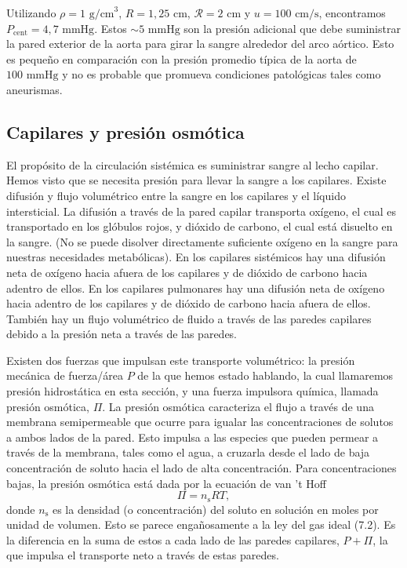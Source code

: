 \documentclass[12pt]{book}
\begin{document}
Utilizando $\rho = 1\text{ g/cm}^3$, $R = 1{,}25\text{ cm}$, $\mathcal{R} = 2\text{ cm}$ y $u = 100\text{ cm/s}$, encontramos $P_{\text{cent}} = 4{,}7\text{ mmHg}$. Estos ${\sim}5\text{ mmHg}$ son la presión adicional que debe suministrar la pared exterior de la aorta para girar la sangre alrededor del arco aórtico. Esto es pequeño en comparación con la presión promedio típica de la aorta de $100\text{ mmHg}$ y no es probable que promueva condiciones patológicas tales como aneurismas.

\subsection{Capilares y presión osmótica}

El propósito de la circulación sistémica es suministrar sangre al lecho capilar. Hemos visto que se necesita presión para llevar la sangre a los capilares. Existe difusión y flujo volumétrico entre la sangre en los capilares y el líquido intersticial. La difusión a través de la pared capilar transporta oxígeno, el cual es transportado en los glóbulos rojos, y dióxido de carbono, el cual está disuelto en la sangre. (No se puede disolver directamente suficiente oxígeno en la sangre para nuestras necesidades metabólicas). En los capilares sistémicos hay una difusión neta de oxígeno hacia afuera de los capilares y de dióxido de carbono hacia adentro de ellos. En los capilares pulmonares hay una difusión neta de oxígeno hacia adentro de los capilares y de dióxido de carbono hacia afuera de ellos. También hay un flujo volumétrico de fluido a través de las paredes capilares debido a la presión neta a través de las paredes.

Existen dos fuerzas que impulsan este transporte volumétrico: la presión mecánica de fuerza/área $P$ de la que hemos estado hablando, la cual llamaremos presión hidrostática en esta sección, y una fuerza impulsora química, llamada presión osmótica, $\Pi$. La presión osmótica caracteriza el flujo a través de una membrana semipermeable que ocurre para igualar las concentraciones de solutos a ambos lados de la pared. Esto impulsa a las especies que pueden permear a través de la membrana, tales como el agua, a cruzarla desde el lado de baja concentración de soluto hacia el lado de alta concentración. Para concentraciones bajas, la presión osmótica está dada por la ecuación de van 't Hoff
\begin{equation}
\Pi = n_{\text{s}} R T,
\label{eq:827}
\end{equation}
donde $n_{\text{s}}$ es la densidad (o concentración) del soluto en solución en moles por unidad de volumen. Esto se parece engañosamente a la ley del gas ideal (7.2). Es la diferencia en la suma de estos a cada lado de las paredes capilares, $P + \Pi$, la que impulsa el transporte neto a través de estas paredes.
\end{document}
